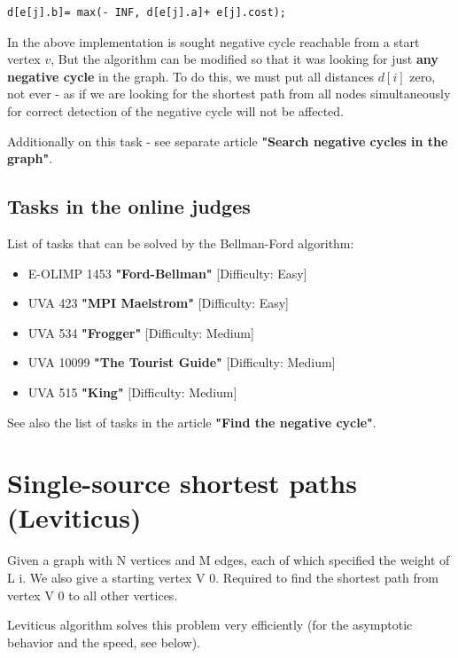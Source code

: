 \begin{verbatim}
d[e[j].b]= max(- INF, d[e[j].a]+ e[j].cost); 
\end{verbatim}
In the above implementation is sought negative cycle reachable from a start vertex $v$, But the algorithm can be modified so that it was looking for just \textbf{any negative cycle} in the graph. To do this, we must put all distances $d [i]$ zero, not ever - as if we are looking for the shortest path from all nodes simultaneously for correct detection of the negative cycle will not be affected.

Additionally on this task - see separate article \textbf{"Search negative cycles in the graph"}.

\subsection{ Tasks in the online judges }

List of tasks that can be solved by the Bellman-Ford algorithm:

\begin{itemize}

\item E-OLIMP 1453 \textbf{"Ford-Bellman"} [Difficulty: Easy]

\item UVA 423 \textbf{"MPI Maelstrom"} [Difficulty: Easy]

\item UVA 534 \textbf{"Frogger"} [Difficulty: Medium]

\item UVA 10099 \textbf{"The Tourist Guide"} [Difficulty: Medium]

\item UVA 515 \textbf{"King"} [Difficulty: Medium]

\end{itemize}

See also the list of tasks in the article \textbf{"Find the negative cycle"}.

\section{ Single-source shortest paths (Leviticus) }
Given a graph with N vertices and M edges, each of which specified the weight of L i. We also give a starting vertex V 0. Required to find the shortest path from vertex V 0 to all other vertices.

Leviticus algorithm solves this problem very efficiently (for the asymptotic behavior and the speed, see below).


